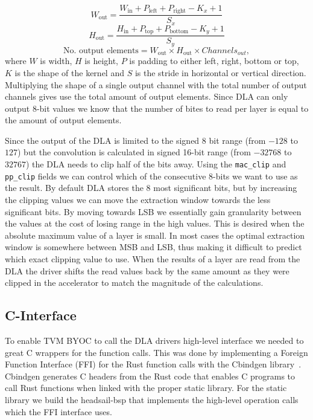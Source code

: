 \documentclass[12pt,a4paper,english
]{tunithesis}
\begin{document}
\begin{equation}
W_{\text{out}} = \frac{W_{\text{in}} + P_{\text{left}} + P_{\text{right}} - K_x + 1}{S_x}
\end{equation}
\begin{equation}
H_{\text{out}} = \frac{H_{\text{in}} + P_{\text{top}} + P_{\text{bottom}} - K_y + 1}{S_y}
\end{equation}
\begin{equation}
\text{No. output elements} = W_{\text{out}} \times H_{\text{out}} \times Channels_{out},
\end{equation}
where $W$ is width, $H$ is height, $P$ is padding to either left, right, bottom or top, $K$ is the shape of the kernel and $S$ is the stride in horizontal or vertical direction.
Multiplying the shape of a single output channel with the total number of output channels gives use the total amount of output elements. Since DLA can only output 8-bit values we know that the number of bites to read per layer is equal to the amount of output elements.

Since the output of the DLA is limited to the signed 8 bit range (from $-128$ to $127$) but the convolution is calculated in signed 16-bit range (from $-32768$ to $32767$) the DLA needs to clip half of the bits away. Using the \texttt{mac\_clip} and \texttt{pp\_clip} fields we can control which of the consecutive 8-bits we want to use as the result. By default DLA stores the 8 most significant bits, but by increasing the clipping values we can move the extraction window towards the less significant bits. By moving towards LSB we essentially gain granularity between the values at the cost of losing range in the high values. This is desired when the absolute maximum value of a layer is small. In most cases the optimal extraction window is somewhere between MSB and LSB, thus making it difficult to predict which exact clipping value to use. When the results of a layer are read from the DLA the driver shifts the read values back by the same amount as they were clipped in the accelerator to match the magnitude of the calculations.

\subsection{C-Interface}
To enable TVM BYOC to call the DLA drivers high-level interface we needed to great C wrappers for the function calls. This was done by implementing a Foreign Function Interface (FFI) for the Rust function calls with the Cbindgen library~\cite{cbindgen}. Cbindgen generates C headers from the Rust code that enables C programs to call Rust functions when linked with the proper static library. For the static library we build the headsail-bsp that implements the high-level operation calls which the FFI interface uses.
\end{document}

